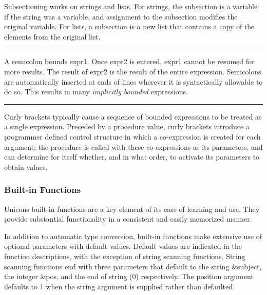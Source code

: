 Subsectioning works on strings and lists. For strings, the subsection is
a variable if the string was a variable, and
assignment to the subsection modifies the
original variable. For lists, a subsection is a new
list that contains a copy of the elements from the original list.

\bigskip\hrule\vspace{0.1cm}

\noindent
A semicolon bounds \textsf{expr1}. Once \textsf{expr2} is entered,
\textsf{expr1} cannot be resumed for more results. The result of
\textsf{expr2} is the result of the entire expression. Semicolons are automatically inserted at ends of lines
wherever it is syntactically allowable to do so. This results in many
\textit{implicitly }\textit{bounded}
expressions.

\bigskip\hrule\vspace{0.1cm}


\noindent
Curly brackets typically cause a sequence
of bounded expressions to be treated as a single expression. Preceded
by a procedure value, curly brackets introduce a programmer defined
control structure in which a co-expression is created for each
argument; the procedure is called with these co-expressions as its
parameters, and can determine for itself whether, and in what order, to
activate its parameters to obtain values.

\subsubsection{Built-in Functions}

Unicon{\textquotesingle}s built-in functions
are a key element of its ease of learning and use. They provide
substantial functionality in a consistent and easily memorized manner.

In addition to automatic type conversion, built-in functions make
extensive use of optional parameters with default values. Default
values are indicated in the function descriptions, with the exception
of string scanning functions. String scanning functions end with three parameters that
default to the string \textsf{\&subject}, the integer \textsf{\&pos},
and the end of string (0) respectively. The position argument defaults
to 1 when the string argument is supplied rather than defaulted.

